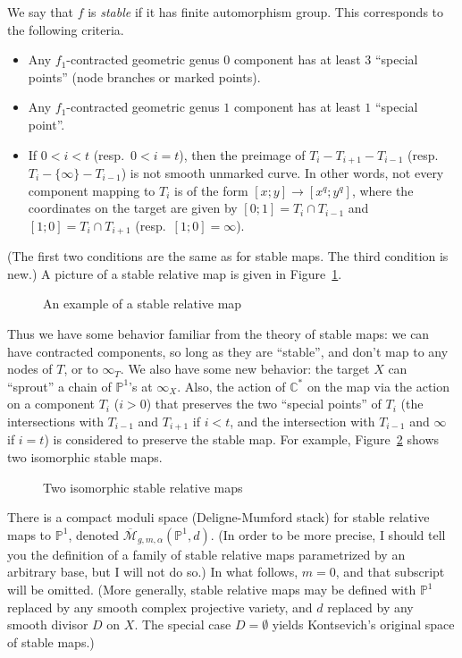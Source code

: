 \documentclass[12pt,letterpaper]{amsart}
\newcommand{\C}{\mathbb{C}}
\newcommand{\proj}{\mathbb P}
\newcommand{\cm}{{\mathcal{M}}}
\newcommand{\cmbar}{\overline{\cm}}
\newcommand{\al}{\alpha}
\newcommand{\lremind}[1]{{\bf[label:  #1]}}
\renewcommand{\lremind}[1]{{}}
\begin{document}
{We say that $f$ is {\em stable} if it has finite automorphism group.
This corresponds to the following criteria. 
\begin{itemize}
\item Any $f_1$-contracted geometric genus $0$ component has at least
  $3$ ``special points'' (node branches or marked points).
\item Any $f_1$-contracted geometric genus $1$ component has at least $1$ ``special point''.
\item If $0<i<t$ (resp.\ $0<i=t$), then the preimage of $T_i - T_{i+1} - T_{i-1}$
(resp.\ $T_i - \{ \infty \} - T_{i-1}$) is not smooth  unmarked
curve.  In other words, not every component mapping to $T_i$ is of the
form $[x;y] \rightarrow [x^q;y^q]$, where the coordinates on the target
are given by  $[0;1] = T_i \cap T_{i-1}$
and $[1;0] = T_i \cap T_{i+1}$  (resp.\ $[1;0] = \infty$).
\end{itemize}
 (The first two conditions
are the same as for stable maps.  The third condition is new.)
A picture of a stable relative map is given in Figure~\ref{rsmfig}.
\begin{figure}
\begin{center}

\end{center}
\caption{An example of a stable relative map \lremind{rsmfig}
}\label{rsmfig}
\end{figure}

Thus we have some behavior familiar from the theory 
of stable maps: we can have contracted components, so long as they are
``stable'', and don't map to any nodes of $T$, or to $\infty_T$.  We
also have some new behavior: the target $X$ can ``sprout'' a chain of
$\proj^1$'s at $\infty_X$.  Also, the action of $\C^*$ on the map via
the action on a component $T_i$ ($i>0$) that preserves the two
``special points'' of $T_i$ (the intersections with $T_{i-1}$ and
$T_{i+1}$ if $i<t$, and the intersection with $T_{i-1}$ and $\infty$
if $i=t$) is considered to preserve the stable map.  For example,
Figure~\ref{isorsm} shows two isomorphic stable maps.
\begin{figure}
\begin{center}

\end{center}
\caption{Two isomorphic stable relative maps \lremind{isorsm}}\label{isorsm}
\end{figure}

There is a compact moduli space (Deligne-Mumford stack) for stable relative
maps to $\proj^1$, denoted $\cmbar_{g,m,\al}(\proj^1, d)$.  (In order
to be more precise, I should tell you the definition of a family of
stable relative maps parametrized by an arbitrary base, but I will not
do so.)  In what follows, $m=0$, and that subscript will be omitted.
(More generally, stable relative maps may be defined with $\proj^1$ replaced by any
smooth complex projective variety, and $d$ replaced by any smooth
divisor $D$ on $X$.  The special case $D=\emptyset$ yields Kontsevich's
original space of stable maps.)

}
\end{document}
